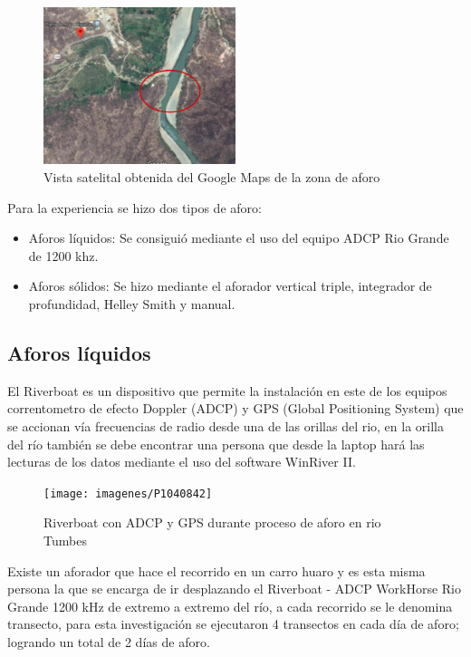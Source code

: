 \documentclass[12pt,a4paper]{report}
\begin{document}
\begin{figure}[h]
  \centering
    \includegraphics[width=0.5\textwidth]{imagenes/ubicacionN01}
  \caption{Vista satelital obtenida del Google Maps de la zona de aforo}
  \label{fig:vistaSatelital}
\end{figure}

Para la experiencia se hizo dos tipos de aforo:
\begin{itemize}
\item Aforos líquidos: Se consiguió mediante el uso del equipo ADCP Rio Grande de 1200 khz.
\item Aforos sólidos: Se hizo mediante el aforador vertical triple, integrador de profundidad, Helley Smith y manual.
\end{itemize}

\subsection{Aforos líquidos}
El Riverboat es un dispositivo que permite la instalación en este de los equipos correntometro de efecto Doppler (ADCP) y GPS (Global Positioning System) que se accionan vía frecuencias de radio desde una de las orillas del rio, en la orilla del río también se debe encontrar una persona que desde la laptop hará las lecturas de los datos mediante el uso del software WinRiver II.

\begin{figure}[h]
  \centering
    \texttt{[image: imagenes/P1040842]}
  \caption{Riverboat con ADCP y GPS durante proceso de aforo en rio Tumbes}
  \label{fig:carroAforador}
\end{figure}






Existe un aforador que hace el recorrido en un carro huaro y es esta misma persona la que se encarga de ir desplazando el Riverboat - ADCP WorkHorse Rio Grande 1200 kHz de extremo a extremo del río, a cada recorrido se le denomina transecto, para esta investigación se ejecutaron 4 transectos en cada día de aforo; logrando un total de 2 días de aforo.
\end{document}
